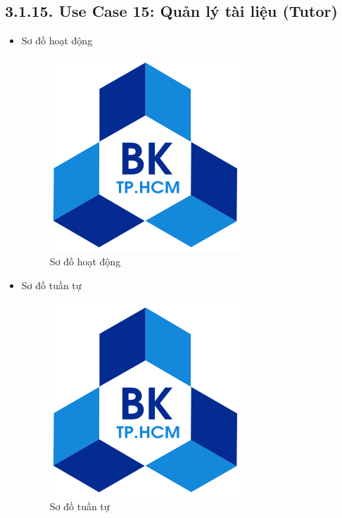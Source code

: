 \subsection*{3.1.15. Use Case 15: Quản lý tài liệu (Tutor)}
\begin{itemize}
    \item Sơ đồ hoạt động
    \begin{figure}[H]
    \centering
    \includegraphics[scale=0.5 ]{Picture/hcmut.png}
    \caption{Sơ đồ hoạt động }
    \end{figure}
    \item Sơ đồ tuần tự
    \begin{figure}[H]
    \centering
    \includegraphics[scale=0.5 ]{Picture/hcmut.png}
    \caption{Sơ đồ tuần tự }
    \end{figure}
\end{itemize}
